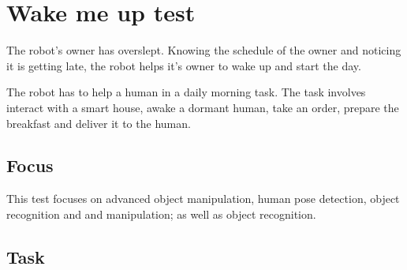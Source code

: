 \section{Wake me up test}

The robot's owner has overslept. Knowing the schedule of the owner and noticing it is getting late, the robot helps it's owner to wake up and start the day.

The robot has to help a human in a daily morning task. The task involves interact with a smart house, awake a dormant human, take an order, prepare the breakfast and deliver it to the human.

\subsection{Focus}

This test focuses on advanced object manipulation, human pose detection, object recognition and and manipulation; as well as object recognition.


\subsection{Task}

